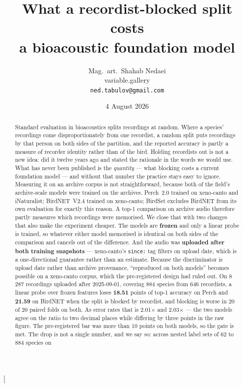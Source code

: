 \documentclass[10pt,twocolumn,a4paper]{article}
\title{\textbf{What a recordist-blocked split costs\\
a bioacoustic foundation model}}
\author{Mag.~art.~Shahab Nedaei\\
  \normalsize variable.gallery\\
  \normalsize \texttt{ned.tabulov@gmail.com}}
\date{4 August 2026}
\begin{document}
\makeatletter
\twocolumn[\begin{@twocolumnfalse}
\maketitle
\begin{abstract}
\noindent
Standard evaluation in bioacoustics splits recordings at random. Where a species'
recordings come disproportionately from one recordist, a random split puts recordings by
that person on both sides of the partition, and the reported accuracy is partly a measure of
recorder identity rather than of the bird. Holding recordists out is not a new idea:
\citet{stowell2014} did it twelve years ago and stated the rationale in the words we would
use. What has never been published is the \emph{quantity} --- what blocking costs a current
foundation model --- and without that number the practice stays easy to ignore.
%
Measuring it on an archive corpus is not straightforward, because both of the field's
archive-scale models were trained on the archives. Perch~2.0 trained on xeno-canto and
iNaturalist; BirdNET~V2.4 trained on xeno-canto; BirdSet excludes BirdNET from its own
evaluation for exactly this reason. A top-1 comparison on archive audio therefore partly
measures which recordings were memorised. We close that with two changes that also make the
experiment cheaper. The models are \textbf{frozen} and only a linear probe is trained, so
whatever either model memorised is identical on both sides of the comparison and cancels out
of the difference. And the audio was \textbf{uploaded after both training snapshots} ---
xeno-canto's \texttt{since:} tag filters on upload date, which is a one-directional
guarantee rather than an estimate. Because the discriminator is upload date rather than
archive provenance, ``reproduced on both models'' becomes possible on a xeno-canto corpus,
which the pre-registered design had ruled out.
%
On 8\,287 recordings uploaded after 2025-09-01, covering 884 species from 646 recordists, a
linear probe over frozen features loses \textbf{18.51} points of top-1 accuracy on Perch and
\textbf{21.59} on BirdNET when the split is blocked by recordist, and blocking is worse in 20 of
20 paired folds on both. As error rates that is 2.01$\times$ and 2.03$\times$ --- the two models
agree on the ratio to two decimal places while differing by three points in the raw figure. The
pre-registered bar was more than 10 points on both models, so the gate is met.
%
The drop is not a single number, and we say so: across nested label sets of 62 to 884 species on

\end{abstract}
\end{@twocolumnfalse}
\end{document}

